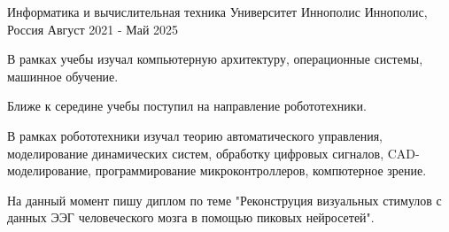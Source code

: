 

\begin{cventries}

  \cventry
    {Информатика и вычислительная техника} %
    {Университет Иннополис} %
    {Иннополис, Россия} %
    {Август 2021 - Май 2025} %
    {
      \begin{cvitems} %
        \item {В рамках учебы изучал компьютерную архитектуру, операционные системы, машинное обучение.} 
        \item {Ближе к середине учебы поступил на направление робототехники.}
        \item {В рамках робототехники изучал теорию автоматического управления, моделирование динамических систем, обработку цифровых сигналов, CAD-моделирование, программирование микроконтроллеров, компютерное зрение.}
        \item {На данный момент пишу диплом по теме "Реконструция визуальных стимулов с данных ЭЭГ человеческого мозга в помощью пиковых нейросетей".}
      \end{cvitems}
    }

\end{cventries}
